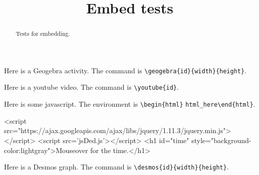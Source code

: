 \documentclass[handout]{ximera}
\title{Embed tests}
\begin{document}
	
\begin{abstract}
Tests for embedding.
\end{abstract}

\maketitle

Here is a Geogebra activity. The command is \verb!\geogebra{id}{width}{height}!.


Here is a youtube video. The command is \verb!\youtube{id}!.


Here is some javascript. The environment is \verb!\begin{html}! \verb!html_here!\verb!\end{html}!.

\begin{html}
<script src="https://ajax.googleapis.com/ajax/libs/jquery/1.11.3/jquery.min.js"></script>
<script src='jsDed.js'></script>
<h1 id="time" style="background-color:lightgray">Mouseover for the time.</h1>
\end{html}

Here is a Desmos graph. The command is \verb!\desmos{id}{width}{height}!.

\end{document}

